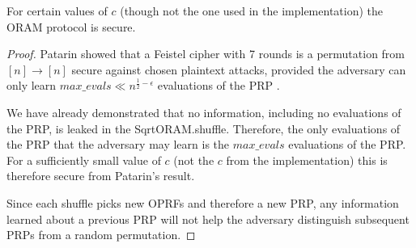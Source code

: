 \begin{theorem}
For certain values of $c$ (though not the one used in the implementation)
the ORAM protocol is secure.
\end{theorem}

\begin{proof}
Patarin showed that a Feistel cipher with 7 rounds is a
permutation from $[n] \rightarrow [n]$ 
secure against chosen plaintext attacks,
provided the adversary can only learn 
$max\_evals \ll n^{\frac{1}{2} - \epsilon}$ evaluations of the PRP
\cite{patarin2003luby}.

We have already demonstrated that no information, including no
evaluations of the PRP, is leaked in the SqrtORAM.shuffle.
Therefore, the only evaluations of the PRP that the adversary may
learn is the $max\_evals$ evaluations of the PRP.
For a sufficiently small value of $c$ (not the $c$ from the implementation)
this is therefore secure from Patarin's result.

Since each shuffle picks new OPRFs and therefore a new PRP,
any information learned about a previous PRP will not help
the adversary distinguish subsequent PRPs from a random permutation.
\end{proof}

